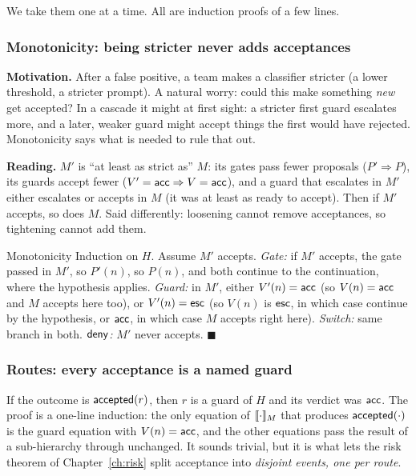 We take them one at a time. All are induction proofs of a few lines.

\subsubsection{Monotonicity: being stricter never adds acceptances}

\textbf{Motivation.} After a false positive, a team makes a classifier stricter (a lower threshold, a stricter prompt). A natural worry: could this make something \emph{new} get accepted? In a cascade it might at first sight: a stricter first guard escalates more, and a later, weaker guard might accept things the first would have rejected. Monotonicity says what is needed to rule that out.

\textbf{Reading.} $M'$ is ``at least as strict as'' $M$: its gates pass fewer proposals ($P'\Rightarrow P$), its guards accept fewer ($V'=\mathsf{acc}\Rightarrow V=\mathsf{acc}$), and a guard that escalates in $M'$ either escalates or accepts in $M$ (it was at least as ready to accept). Then if $M'$ accepts, so does $M$. Said differently: loosening cannot remove acceptances, so tightening cannot add them.

\begin{plainproof}{Monotonicity}
Induction on $H$. Assume $M'$ accepts. \emph{Gate:} if $M'$ accepts, the gate passed in $M'$, so $P'(n)$, so $P(n)$, and both continue to the continuation, where the hypothesis applies. \emph{Guard:} in $M'$, either $V'(n)=\mathsf{acc}$ (so $V(n)=\mathsf{acc}$ and $M$ accepts here too), or $V'(n)=\mathsf{esc}$ (so $V(n)$ is $\mathsf{esc}$, in which case continue by the hypothesis, or $\mathsf{acc}$, in which case $M$ accepts right here). \emph{Switch:} same branch in both. \emph{$\mathsf{deny}$:} $M'$ never accepts. \hfill$\blacksquare$
\end{plainproof}

\subsubsection{Routes: every acceptance is a named guard}

If the outcome is $\mathsf{accepted}(r)$, then $r$ is a guard of $H$ and its verdict was $\mathsf{acc}$. The proof is a one-line induction: the only equation of $\llbracket \cdot\rrbracket_{M}$ that produces $\mathsf{accepted}(\cdot)$ is the guard equation with $V(n)=\mathsf{acc}$, and the other equations pass the result of a sub-hierarchy through unchanged. It sounds trivial, but it is what lets the risk theorem of Chapter~\ref{ch:risk} split acceptance into \emph{disjoint events, one per route}.

